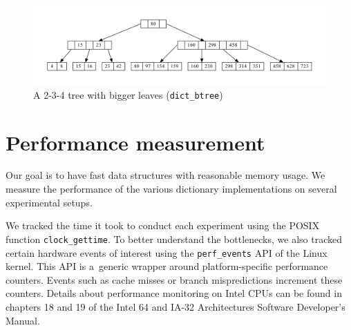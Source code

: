 \begin{figure}
\centering
\includegraphics[width=\linewidth]{img/btree}
\caption{A 2-3-4 tree with bigger leaves (\texttt{dict\_btree})}
\end{figure}

\section{Performance measurement}

Our goal is to have fast data structures with reasonable memory usage.
We measure the performance of the various dictionary implementations
on several experimental setups.

We tracked the time it took to conduct each experiment using the POSIX function
\texttt{clock\_gettime}. To better understand the bottlenecks, we also
tracked certain hardware events of interest using the \texttt{perf\_events} API
of the Linux kernel. This API is a~generic wrapper around platform-specific
performance counters. Events such as cache misses or branch mispredictions
increment these counters.
Details about performance monitoring on Intel CPUs can be found in
chapters 18 and 19 of the Intel 64 and IA-32 Architectures Software
Developer’s Manual\cite{intel-manual}.

